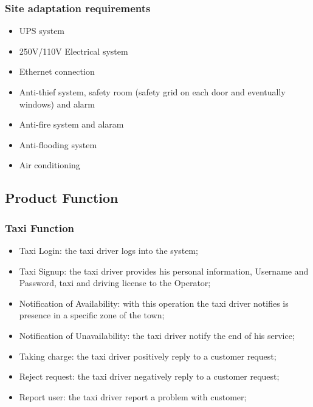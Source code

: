 \documentclass[english]{article}
\begin{document}
\subsubsection{Site adaptation requirements}

\begin{itemize}
	\item UPS system
	\item 250V/110V Electrical system
	\item Ethernet connection
	\item Anti-thief system, safety room (safety grid on each door and eventually windows) and alarm
	\item Anti-fire system and alaram
	\item Anti-flooding system
	\item Air conditioning
\end{itemize}

\subsection{Product Function}

\subsubsection{Taxi Function}
\begin{itemize}
	\item Taxi Login: the taxi driver logs into the system;
	\item Taxi Signup: the taxi driver provides his personal information, Username and Password, taxi  and driving license to the Operator;
	\item Notification of Availability: with this operation the taxi driver notifies is presence in a specific zone of the town;
	\item Notification of Unavailability: the taxi driver notify the end of his service;
	\item Taking charge: the taxi driver positively reply to a customer request;
	\item Reject request: the taxi driver negatively reply to a customer request;
	\item Report user: the taxi driver report a problem with customer;
\end{itemize}
\end{document}
